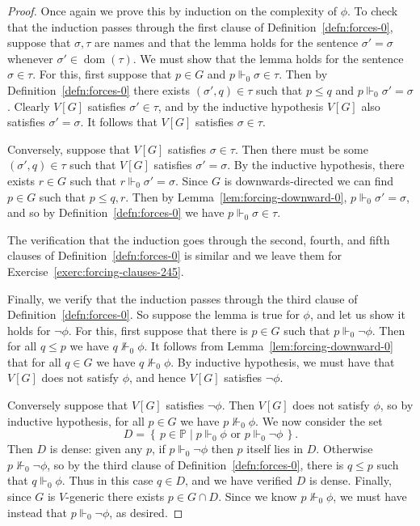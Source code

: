\documentclass[11pt,oneside,a4paper]{amsbook}
\newcommand{\set}[1]{\left\{\,#1\,\right\}}
\newcommand{\PP}{\mathbb P}
\newcommand{\forces}{\Vdash}
\DeclareMathOperator{\dom}{dom}
\theoremstyle{definition}
\theoremstyle{plain}
\theoremstyle{definition}
\theoremstyle{remark}
\numberwithin{equation}{section}
\numberwithin{figure}{section}
\begin{document}
\begin{proof}
  Once again we prove this by induction on the complexity of $\phi$. To check that the induction passes through the first clause of Definition~\ref{defn:forces-0}, suppose that $\sigma,\tau$ are names and that the lemma holds for the sentence $\sigma'=\sigma$ whenever $\sigma'\in\dom(\tau)$. We must show that the lemma holds for the sentence $\sigma\in\tau$. For this, first suppose that $p\in G$ and $p\forces_0\sigma\in\tau$. Then by Definition~\ref{defn:forces-0} there exists $(\sigma',q)\in\tau$ such that $p\leq q$ and $p\forces_0\sigma'=\sigma$. Clearly $V[G]$ satisfies $\sigma'\in\tau$, and by the inductive hypothesis $V[G]$ also satisfies $\sigma'=\sigma$. It follows that $V[G]$ satisfies $\sigma\in\tau$.

  Conversely, suppose that $V[G]$ satisfies $\sigma\in\tau$. Then there must be some $(\sigma',q)\in\tau$ such that $V[G]$ satisfies $\sigma'=\sigma$. By the inductive hypothesis, there exists $r\in G$ such that $r\forces_0\sigma'=\sigma$. Since $G$ is downwards-directed we can find $p\in G$ such that $p\leq q,r$. Then by Lemma~\ref{lem:forcing-downward-0}, $p\forces_0\sigma'=\sigma$, and so by Definition~\ref{defn:forces-0} we have $p\forces_0\sigma\in\tau$.

  The verification that the induction goes through the second, fourth, and fifth clauses of Definition~\ref{defn:forces-0} is similar and we leave them for Exercise~\ref{exerc:forcing-clauses-245}.

  Finally, we verify that the induction passes through the third clause of Definition~\ref{defn:forces-0}. So suppose the lemma is true for $\phi$, and let us show it holds for $\neg\phi$. For this, first suppose that there is $p\in G$ such that $p\forces_0\neg\phi$. Then for all $q\leq p$ we have $q\not\forces_0\phi$. It follows from Lemma~\ref{lem:forcing-downward-0} that for all $q\in G$ we have $q\not\forces_0\phi$. By inductive hypothesis, we must have that $V[G]$ does not satisfy $\phi$, and hence $V[G]$ satisfies $\neg\phi$.

  Conversely suppose that $V[G]$ satisfies $\neg\phi$. Then $V[G]$ does not satisfy $\phi$, so by inductive hypothesis, for all $p\in G$ we have $p\not\forces_0\phi$. We now consider the set
\[D=\set{p\in\PP\mid p\forces_0\phi\text{ or }p\forces_0\neg\phi}\text{.}
\]
Then $D$ is dense: given any $p$, if $p\forces_0\neg\phi$ then $p$ itself lies in $D$. Otherwise $p\not\forces_0\neg\phi$, so by the third clause of Definition~\ref{defn:forces-0}, there is $q\leq p$ such that $q\forces_0\phi$. Thus in this case $q\in D$, and we have verified $D$ is dense. Finally, since $G$ is $V$-generic there exists $p\in G\cap D$. Since we know $p\not\forces_0\phi$, we must have instead that $p\forces_0\neg\phi$, as desired.
\end{proof}
\end{document}
